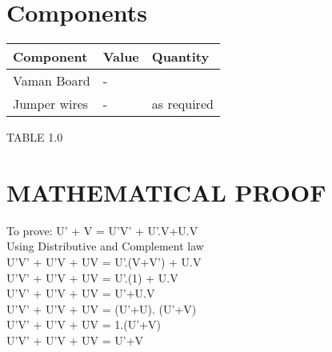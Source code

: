 \documentclass[10pt, a4paper]{article}
\title{\mytitle}
\author{\myauthor\hspace{1em}\\\contact\\IITH\hspace{0.5em}-\hspace{0.5em}\mymodule}
\date{}
\begin{document}
   
	\maketitle
	\tableofcontents
	\begin{abstract}
	   The objective of this manual is to show how
       to Verify the Boolean Expression using \textbf{ARM} Processor-\textbf{VAMAN} Board\\
	        U’ + V = U’V’ + U’.V+U.V
	\end{abstract}
\section{Components}
\begin{tabularx}{0.45\textwidth} { 
  | >{\centering\arraybackslash}X 
  | >{\centering\arraybackslash}X
  | >{\centering\arraybackslash}X | }
\hline
\textbf{Component} & \textbf{Value} & \textbf{Quantity} \\      
\hline
Vaman Board &-& 1 \\
\hline 
Jumper wires&-&as required\\
\hline
\end{tabularx}
\begin{center}
    TABLE 1.0
\end{center}
\section{MATHEMATICAL PROOF}
To prove: U’ + V = U’V’ + U’.V+U.V
\vspace{0.3cm}\\
Using Distributive and Complement law
\vspace{0.2cm}\\
U'V' + U'V + UV = U’.(V+V’) + U.V
\vspace{0.1cm}\\
U'V' + U'V + UV = U’.(1) + U.V
\vspace{0.1cm}\\
U'V' + U'V + UV = U’+U.V
\vspace{0.1cm}\\
U'V' + U'V + UV = (U’+U). (U’+V)
\vspace{0.1cm}\\
U'V' + U'V + UV = 1.(U’+V)
\vspace{0.1cm}\\
U'V' + U'V + UV = U’+V
\end{document}
